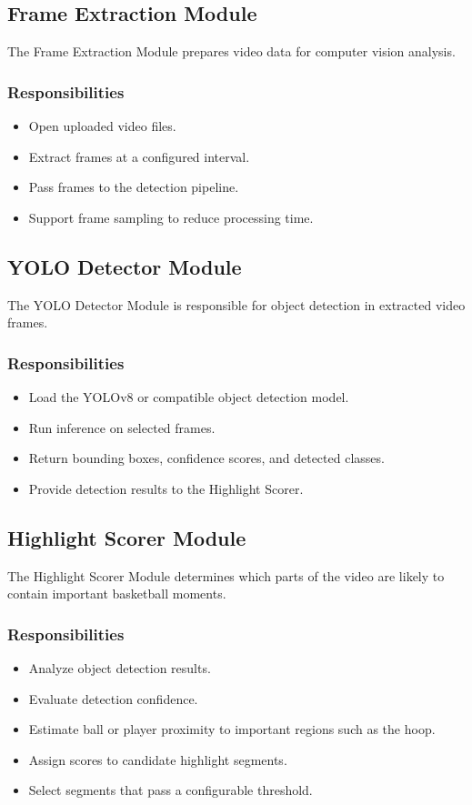 \documentclass[12pt]{article}
\begin{document}
\subsection{Frame Extraction Module}
The Frame Extraction Module prepares video data for computer vision analysis.

\subsubsection*{Responsibilities}
\begin{itemize}[noitemsep]
    \item Open uploaded video files.
    \item Extract frames at a configured interval.
    \item Pass frames to the detection pipeline.
    \item Support frame sampling to reduce processing time.
\end{itemize}

\subsection{YOLO Detector Module}
The YOLO Detector Module is responsible for object detection in extracted video frames.

\subsubsection*{Responsibilities}
\begin{itemize}[noitemsep]
    \item Load the YOLOv8 or compatible object detection model.
    \item Run inference on selected frames.
    \item Return bounding boxes, confidence scores, and detected classes.
    \item Provide detection results to the Highlight Scorer.
\end{itemize}

\subsection{Highlight Scorer Module}
The Highlight Scorer Module determines which parts of the video are likely to contain important basketball moments.

\subsubsection*{Responsibilities}
\begin{itemize}[noitemsep]
    \item Analyze object detection results.
    \item Evaluate detection confidence.
    \item Estimate ball or player proximity to important regions such as the hoop.
    \item Assign scores to candidate highlight segments.
    \item Select segments that pass a configurable threshold.
\end{itemize}
\end{document}
